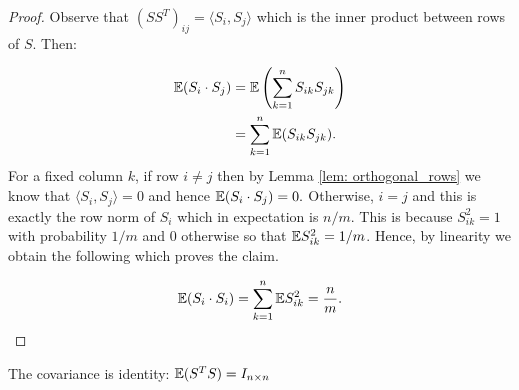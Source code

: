 \begin{proof}
  Observe that $(S S^T)_{ij} = \langle S_i, S_j \rangle$ which is the inner
  product between rows of $S$.
  Then:

  \begin{align}
    \mathbb{E} (S_i \cdot S_j) &= \mathbb{E} \left( \sum_{k=1}^n S_{ik} S_{jk} \right) \\
                       &= \sum_{k=1}^n \mathbb{E} (S_{ik} S_{jk}).
  \end{align}
  For a fixed column $k$, if row $i \ne j$ then by Lemma \ref{lem:
  orthogonal_rows} we know that $\langle S_i, S_j \rangle = 0$ and
  hence $\mathbb{E} (S_i \cdot S_j) = 0.$
  Otherwise, $i=j$ and this is exactly the row norm of $S_i$ which in expectation
  is $n/m$.
  This is because $S_{ik}^2 = 1$ with probability $1/m$ and 0 otherwise
  so that $\mathbb{E} S_{ik}^2 = 1/m$.
  Hence, by linearity we obtain the following which proves the claim.

  \begin{equation}
    \mathbb{E} (S_i \cdot S_i) = \sum_{k=1}^n \mathbb{E} S_{ik}^2 =
     \frac{n}{m}.
  \end{equation}
\end{proof}

\begin{Lemma} \label{lem: covariance_matrix}
  The covariance is identity: $\mathbb{E}(S^TS) = I_{n \times n}$
\end{Lemma}

